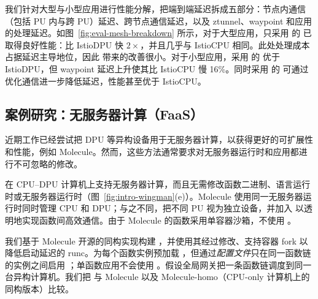 \label{subs:eval-scale}
我们针对大型与小型应用进行性能分解，把端到端延迟拆成五部分：节点内通信（包括 PU 内与跨 PU）延迟、跨节点通信延迟，以及 ztunnel、waypoint 和应用的处理延迟。如图~\ref{fig:eval-mesh-breakdown} 所示，对于大型应用，只采用 \giptable 的 \mesh 已取得良好性能：比 IstioDPU 快 $2\times$，并且几乎与 IstioCPU 相同。此处处理成本占据延迟主导地位，因此 \gsocket 带来的改善很小。对于小型应用，采用 \giptable 的 \mesh 优于 IstioDPU，但 waypoint 延迟上升使其比 IstioCPU 慢 16\%。同时采用 \gsocket 的 \mesh 可通过优化通信进一步降低延迟，性能甚至优于 IstioCPU。

\subsection{案例研究：无服务器计算（FaaS）}
\label{s:case-FaaS}

近期工作\cite{10.1145/3472883.3486972,10.1145/3503222.3507732,copik2022rfaas,wei2022provisioned}已经尝试把 DPU 等异构设备用于无服务器计算，以获得更好的可扩展性和性能，例如 Molecule\cite{10.1145/3503222.3507732}。然而，这些方法通常要求对无服务器运行时和应用都进行不可忽略的修改。

\sys 在 CPU--DPU 计算机上支持无服务器计算，而且无需修改函数二进制、语言运行时或无服务器运行时（图~\ref{fig:intro-wingman}(e)）。Molecule 使用同一无服务器运行时同时管理 CPU 和 DPU；与之不同，\faas 把不同 PU 视为独立设备，并加入 \os 以透明地实现函数间高效通信。由于 Molecule 的函数采用单容器沙箱，\faas 不使用 \giptable。

我们基于 Molecule 开源的同构实现构建 \faas，并使用其经过修改、支持容器 fork 以降低启动延迟的 runc。\faas 为每个函数实例预加载 \os，但通过\emph{配置文件}只在同一函数链的实例之间启用 \gsocket；单函数应用不会使用 \os。\faas 假设全局网关把一条函数链调度到同一台异构计算机。我们把 \faas 与 Molecule 以及 Molecule-homo（CPU-only 计算机上的同构版本）比较。

